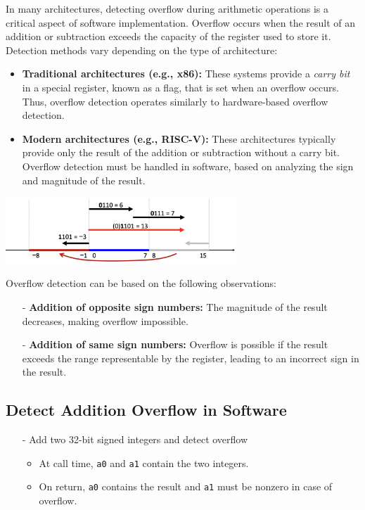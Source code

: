 In many architectures, detecting overflow during arithmetic operations is a critical aspect of software implementation. Overflow occurs when the result of an addition or subtraction exceeds the capacity of the register used to store it. Detection methods vary depending on the type of architecture:

\begin{itemize}
    \item \textbf{Traditional architectures (e.g., x86):} These systems provide a \textit{carry bit} in a special register, known as a flag, that is set when an overflow occurs. Thus, overflow detection operates similarly to hardware-based overflow detection.
    
    \item \textbf{Modern architectures (e.g., RISC-V):} These architectures typically provide only the result of the addition or subtraction without a carry bit. Overflow detection must be handled in software, based on analyzing the sign and magnitude of the result.
\end{itemize}

\begin{center}
    \includegraphics[width=0.65\textwidth]{chapters/chapter1e/images/overflow.png}
\end{center}
Overflow detection can be based on the following observations:
\begin{itemize}
    \item[-] \textbf{Addition of opposite sign numbers:} The magnitude of the result decreases, making overflow impossible.
    \item[-] \textbf{Addition of same sign numbers:} Overflow is possible if the result exceeds the range representable by the register, leading to an incorrect sign in the result.
\end{itemize}
\subsection{Detect Addition Overflow in Software}
\begin{itemize}
    \item[-] Add two 32-bit signed integers and detect overflow
    \begin{itemize}
        \item At call time, \texttt{a0} and \texttt{a1} contain the two integers.
        \item On return, \texttt{a0} contains the result and \texttt{a1} must be nonzero in case of overflow.
    \end{itemize}
\end{itemize}


